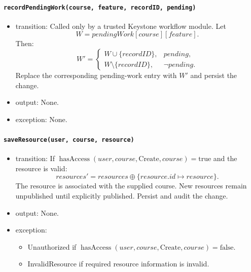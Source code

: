 \documentclass[12pt, titlepage]{article}
\begin{document}
\paragraph{\texttt{recordPendingWork(course, feature, recordID, pending)}}
\begin{itemize}
    \item transition: Called only by a trusted Keystone workflow module. Let
    \[
    W=\mathit{pendingWork}[course][feature].
    \]
    Then:
    \[
    W'=
    \begin{cases}
        W\cup\{recordID\}, & pending,\\
        W\setminus\{recordID\}, & \neg pending.
    \end{cases}
    \]
    Replace the corresponding pending-work entry with $W'$ and persist the change.

    \item output: None.

    \item exception: None.
\end{itemize}

\paragraph{\texttt{saveResource(user, course, resource)}}
\begin{itemize}
    \item transition: If $\operatorname{hasAccess}(user,course,\text{Create},course)=\text{true}$ and the resource is valid:
    \[
    \mathit{resources}'=
    \mathit{resources}\oplus
    \{resource.id\mapsto resource\}.
    \]
    The resource is associated with the supplied course. New resources remain unpublished until explicitly published. Persist and audit the change.

    \item output: None.

    \item exception:
    \begin{itemize}
        \item Unauthorized if $\operatorname{hasAccess}(user,course,\text{Create},course)=\text{false}$.
        \item InvalidResource if required resource information is invalid.
    \end{itemize}
\end{itemize}
\end{document}

